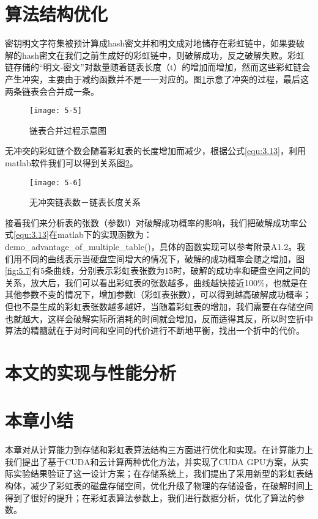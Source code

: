 \section{算法结构优化}
密钥明文字符集被预计算成hash密文并和明文成对地储存在彩虹链中，如果要破解的hash密文在我们之前生成好的彩虹链中，则破解成功，反之破解失败。彩虹链存储的“明文-密文”对数量随着链表长度（t）的增加而增加，然而这些彩虹链会产生冲突，主要由于减约函数并不是一一对应的。图\ref{fig:5.5}示意了冲突的过程，最后这两条链表会合并成一条。
\begin{figure}[!ht]
\centering
\texttt{[image: 5-5]}
\caption{链表合并过程示意图}
\label{fig:5.5}
\end{figure}

无冲突的彩虹链个数会随着彩虹表的长度增加而减少，根据公式\eqref{equ:3.13}，利用matlab软件我们可以得到关系图\ref{fig:5.6}。
\begin{figure}[!ht]
\centering
\texttt{[image: 5-6]}
\caption{无冲突链表数－链表长度关系}
\label{fig:5.6}
\end{figure}

接着我们来分析表的张数（参数l）对破解成功概率的影响，我们把破解成功率公式\eqref{equ:3.13}在matlab下的实现函数为：\\
demo\_advantage\_of\_multiple\_table()，具体的函数实现可以参考附录A1.2。我们用不同的曲线表示当硬盘空间增大的情况下，破解的成功概率会随之增加，图\ref{fig:5.7}有5条曲线，分别表示彩虹表张数为1\~5时，破解的成功率和硬盘空间之间的关系，放大后，我们可以看出彩虹表的张数越多，曲线越快接近100\%，也就是在其他参数不变的情况下，增加参数l（彩虹表张数），可以得到越高破解成功概率；但也不是生成的彩虹表张数越多越好，当随着彩虹表的增加，我们需要在存储空间也就越大，这样会破解实际所消耗的时间就会增加，反而适得其反，所以时空折中算法的精髓就在于对时间和空间的代价进行不断地平衡，找出一个折中的代价。
\begin{figure}[!h]
\begin{floatrow}
\end{floatrow}
\end{figure}
\section{本文的实现与性能分析}
\section{本章小结}
本章对从计算能力到存储和彩虹表算法结构三方面进行优化和实现。在计算能力上我们提出了基于CUDA和云计算两种优化方法，并实现了CUDA GPU方案，从实际实验结果验证了这一设计方案；在存储系统上，我们提出了采用新型的彩虹表结构体，减少了彩虹表的磁盘存储空间，优化升级了物理的存储设备，在破解时间上得到了很好的提升；在彩虹表算法参数上，我们进行数据分析，优化了算法的参数。

\begin{figure}[!h]
\begin{floatrow}
\end{floatrow}
\end{figure}

